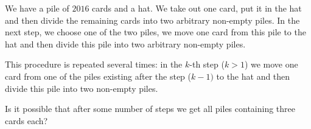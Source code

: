\documentclass[varwidth]{standalone}
\begin{document}
    We have a pile of $2016$ cards and a hat. We take out one card, put it in the hat and then divide the remaining cards into two arbitrary non-empty piles. In the next step, we choose one of the two piles, we move one card from this pile to the hat and then divide this pile into two arbitrary non-empty piles.

    This procedure is repeated several times: in the $k$-th step ($k > 1$) we move one card from one of the piles existing after the step ($k - 1)$ to the hat and then divide this pile into two non-empty piles.

    Is it possible that after some number of steps we get all piles containing three cards each?
\end{document}
